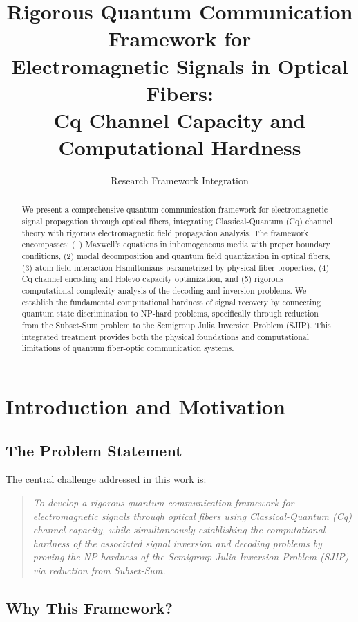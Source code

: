 \documentclass[12pt,a4paper]{article}
\title{\textbf{Rigorous Quantum Communication Framework for\\
Electromagnetic Signals in Optical Fibers:\\
Cq Channel Capacity and Computational Hardness}}
\author{Research Framework Integration}
\date{}
\begin{document}
\maketitle

\begin{abstract}
We present a comprehensive quantum communication framework for electromagnetic signal propagation through optical fibers, integrating Classical-Quantum (Cq) channel theory with rigorous electromagnetic field propagation analysis. The framework encompasses: (1) Maxwell's equations in inhomogeneous media with proper boundary conditions, (2) modal decomposition and quantum field quantization in optical fibers, (3) atom-field interaction Hamiltonians parametrized by physical fiber properties, (4) Cq channel encoding and Holevo capacity optimization, and (5) rigorous computational complexity analysis of the decoding and inversion problems. We establish the fundamental computational hardness of signal recovery by connecting quantum state discrimination to NP-hard problems, specifically through reduction from the Subset-Sum problem to the Semigroup Julia Inversion Problem (SJIP). This integrated treatment provides both the physical foundations and computational limitations of quantum fiber-optic communication systems.
\end{abstract}

\newpage
\tableofcontents
\newpage

\section{Introduction and Motivation}

\subsection{The Problem Statement}

The central challenge addressed in this work is:

\begin{quote}
\textit{To develop a rigorous quantum communication framework for electromagnetic signals through optical fibers using Classical-Quantum (Cq) channel capacity, while simultaneously establishing the computational hardness of the associated signal inversion and decoding problems by proving the NP-hardness of the Semigroup Julia Inversion Problem (SJIP) via reduction from Subset-Sum.}
\end{quote}

\subsection{Why This Framework?}
\end{document}
